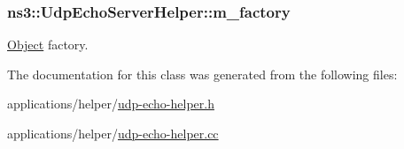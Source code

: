 \subsubsection[{\texorpdfstring{m\+\_\+factory}{m_factory}}]{ ns3\+::\+Udp\+Echo\+Server\+Helper\+::m\+\_\+factory\hspace{0.3cm}{\ttfamily [private]}}\hypertarget{classns3_1_1UdpEchoServerHelper_a240b5f2b5e55440647691ce3e0cf3218}{}\label{classns3_1_1UdpEchoServerHelper_a240b5f2b5e55440647691ce3e0cf3218}


\hyperlink{classns3_1_1Object}{Object} factory. 



The documentation for this class was generated from the following files\+:\begin{DoxyCompactItemize}
\item 
applications/helper/\hyperlink{udp-echo-helper_8h}{udp-\/echo-\/helper.\+h}\item 
applications/helper/\hyperlink{udp-echo-helper_8cc}{udp-\/echo-\/helper.\+cc}\end{DoxyCompactItemize}
